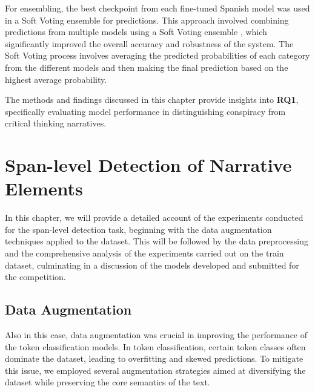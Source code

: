 \documentclass{Configuration_Files/PoliMi3i_thesis}
\begin{document}
\noindent For ensembling, the best checkpoint from each fine-tuned Spanish model was used in a Soft Voting ensemble for predictions. This approach involved combining predictions from multiple models using a Soft Voting ensemble \cite{covid_soft_voting_2022}, which significantly improved the overall accuracy and robustness of the system. The Soft Voting process involves averaging the predicted probabilities of each category from the different models and then making the final prediction based on the highest average probability.


The methods and findings discussed in this chapter provide insights into \textbf{RQ1}, specifically evaluating model performance in distinguishing conspiracy from critical thinking narratives.


\chapter{Span-level Detection of Narrative Elements} \label{chap:token_class_task}
In this chapter, we will provide a detailed account of the experiments conducted for the span-level detection task, beginning with the data augmentation techniques applied to the dataset. This will be followed by the data preprocessing and the comprehensive analysis of the experiments carried out on the train dataset, culminating in a discussion of the models developed and submitted for the competition.

\section{Data Augmentation} \label{sec:data_augmentation_T2}
Also in this case, data augmentation was crucial in improving the performance of the token classification models. In token classification, certain token classes often dominate the dataset, leading to overfitting and skewed predictions. To mitigate this issue, we employed several augmentation strategies aimed at diversifying the dataset while preserving the core semantics of the text. 
 
\end{document}
